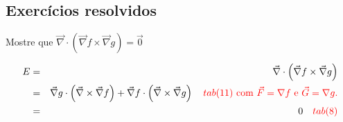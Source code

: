 \subsection*{Exercícios resolvidos}
\begin{exeresol}
  Mostre que $\vec{\nabla}\cdot\left(\vec{\nabla}f \times \vec{\nabla}g\right)=\vec{0}$
\end{exeresol}
\begin{resol}
\begin{eqnarray*}
 E&=&\vec{\nabla}\cdot\left(\vec{\nabla}f \times \vec{\nabla}g\right) \\
  &=&\vec{\nabla}g\cdot\left(\vec{\nabla}\times \vec{\nabla}f\right)+\vec{\nabla}f\cdot\left(\vec{\nabla}\times \vec{\nabla}g\right) ~~~{\color{red} tab(11)~\text{com}~\vec{F}=\nabla f~\text{e}~\vec{G}=\nabla g.}\\
  &=&0~~~{\color{red} tab(8)}\\
\end{eqnarray*}
\end{resol}

